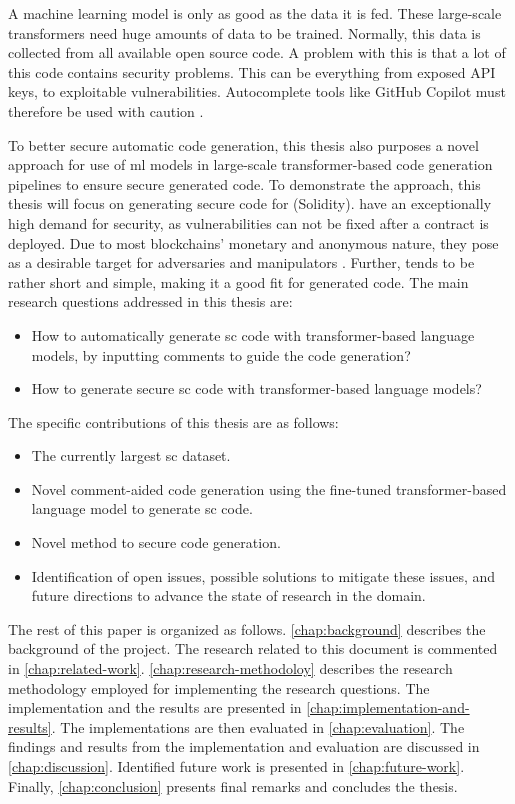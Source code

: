 A machine learning model is only as good as the data it is fed. These large-scale transformers need huge amounts of data to be trained. Normally, this data is collected from all available open source code. A problem with this is that a lot of this code contains security problems. This can be everything from exposed API keys, to exploitable vulnerabilities. Autocomplete tools like GitHub Copilot must therefore be used with caution \cite{chen2021codex}. 

To better secure automatic code generation, this thesis also purposes a novel approach for use of \acrshort{ml} models in large-scale transformer-based code generation pipelines to ensure secure generated code. To demonstrate the approach, this thesis will focus on generating secure code for  (Solidity).  have an exceptionally high demand for security, as vulnerabilities can not be fixed after a contract is deployed. Due to most blockchains' monetary and anonymous nature, they pose as a desirable target for adversaries and manipulators \cite{atzei2017survey}. Further,  tends to be rather short and simple, making it a good fit for generated code. The main research questions addressed in this thesis are:
\begin{itemize}
    \item How to automatically generate \acrlong{sc} code with transformer-based language models, by inputting comments to guide the code generation?
    \item How to generate secure \acrlong{sc} code with transformer-based language models?
\end{itemize}

\noindent
The specific contributions of this thesis are as follows:
\begin{itemize}
    \item The currently largest \acrfull{sc} dataset.
    \item Novel comment-aided code generation using the fine-tuned transformer-based language model to generate \acrlong{sc} code.
    \item Novel method to secure code generation.
    \item Identification of open issues, possible solutions to mitigate these issues, and future directions to advance the state of research in the domain.
\end{itemize}

The rest of this paper is organized as follows. \cref{chap:background} describes the background of the project. The research related to this document is commented in \cref{chap:related-work}. \cref{chap:research-methodoloy} describes the research methodology employed for implementing the research questions. The implementation and the results are presented in \cref{chap:implementation-and-results}. The implementations are then evaluated in \cref{chap:evaluation}. The findings and results from the implementation and evaluation are discussed in \cref{chap:discussion}. Identified future work is presented in \cref{chap:future-work}. Finally, \cref{chap:conclusion} presents final remarks and concludes the thesis.

